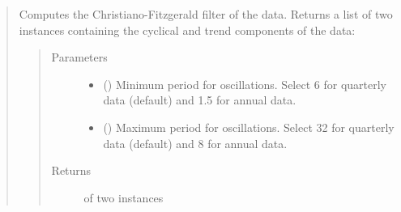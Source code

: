 \documentclass[letterpaper,10pt,openany,oneside,english]{sphinxmanual}
\begin{document}
\begin{fulllineitems}
\begin{quote}

\begin{fulllineitems}
\label{\detokenize{series_class:fredpy.series.cffilter}}
Computes the Christiano-Fitzgerald filter of the data. Returns a list of two {\hyperref[\detokenize{series_class:fredpy.series}]{}} instances containing the cyclical and trend components of the data:
\begin{quote}

\end{quote}
\begin{quote}\begin{description}
\item[{Parameters}] \leavevmode\begin{itemize}
\item {} 
 () \textendash{} Minimum period for oscillations. Select 6 for quarterly data (default) and 1.5 for annual data.

\item {} 
 () \textendash{} Maximum period for oscillations. Select 32 for quarterly data (default) and 8 for annual data.

\end{itemize}

\item[{Returns}] \leavevmode
{} of two {\hyperref[\detokenize{series_class:fredpy.series}]{}} instances

\end{description}\end{quote}

\end{fulllineitems}



\end{quote}
\end{fulllineitems}
\end{document}
